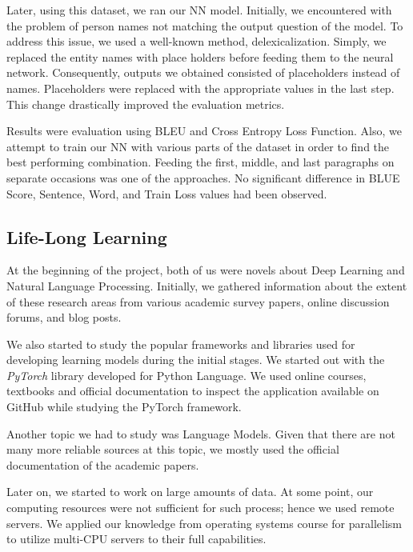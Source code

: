 \documentclass{mefsdp}
\begin{document}
	Later, using this dataset, we ran our NN model. Initially, we encountered with the problem of person names not matching the output question of the model. To address this issue, we used a well-known method, delexicalization. Simply, we replaced the entity names with place holders before feeding them to the neural network. Consequently, outputs we obtained consisted of placeholders instead of names. Placeholders were replaced with the appropriate values in the last step. This change drastically improved the evaluation metrics. \newline \par  
	
	Results were evaluation using BLEU and Cross Entropy Loss Function. Also, we attempt to train our NN with various parts of the dataset in order to find the best performing combination. Feeding the first, middle, and last paragraphs on separate occasions was one of the approaches. No significant difference in BLUE Score, Sentence, Word, and Train Loss values had been observed.
	
	
	
	
	\subsection{Life-Long Learning}
	At the beginning of the project, both of us were novels about Deep Learning and Natural Language Processing. Initially, we gathered information about the extent of these research areas from various academic survey papers, online discussion forums, and blog posts. \newline \par
	
	We also started to study the popular frameworks and libraries used for developing learning models during the initial stages. We started out with the \textit{PyTorch} library developed for Python Language. We used online courses, textbooks and official documentation to inspect the application available on GitHub while studying the PyTorch framework. \newline \par
	
	Another topic we had to study was Language Models. Given that there are not many more reliable sources at this topic, we mostly used the official documentation of the academic papers.\newline \par
	
	Later on, we started to work on large amounts of data. At some point, our computing resources were not sufficient for such process; hence we used remote servers. We applied our knowledge from operating systems course for parallelism to utilize multi-CPU servers to their full capabilities. \newline \par
	
\end{document}
